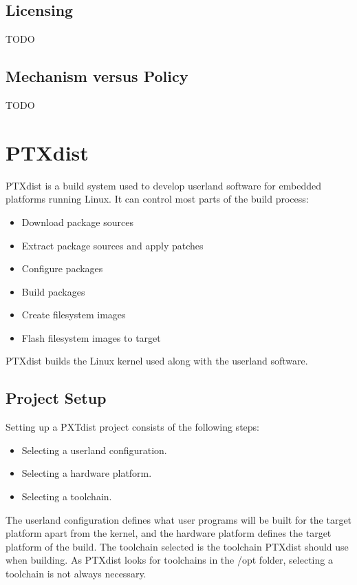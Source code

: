 \subsection{Licensing}
TODO %

\subsection{Mechanism versus Policy}
TODO %



\section{PTXdist}\label{sec:ptxdist}
PTXdist is a build system used to develop userland software for embedded platforms running Linux. It can control most parts of the build process:
\begin{itemize}
  \item Download package sources
  \item Extract package sources and apply patches
  \item Configure packages
  \item Build packages
  \item Create filesystem images
  \item Flash filesystem images to target
\end{itemize}
PTXdist builds the Linux kernel used along with the userland software.

\subsection{Project Setup}
Setting up a PXTdist project consists of the following steps:
\begin{itemize}
  \item Selecting a userland configuration.
  \item Selecting a hardware platform.
  \item Selecting a toolchain.
\end{itemize}
The userland configuration defines what user programs will be built for the target platform apart from the kernel, and the hardware platform defines the target platform of the build. The toolchain selected is the toolchain PTXdist should use when building. As PTXdist looks for toolchains in the /opt folder, selecting a toolchain is not always necessary.

